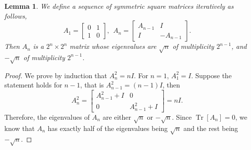 \documentclass[12pt]{article}
\DeclareMathOperator{\Tr}{Tr}
\theoremstyle{plain}
\newtheorem{lemma}[theorem]{Lemma}
\theoremstyle{definition}
\begin{document}
\begin{lemma}\label{lem_eig}
We define a sequence of symmetric square matrices iteratively as follows,
$$A_1=\begin{bmatrix} 0 & 1 \\
1 & 0 \end{bmatrix},~~A_{n}=\begin{bmatrix} A_{n-1} & I \\
I & -A_{n-1} \end{bmatrix}.$$
Then $A_n$ is a $2^{n} \times 2^n$ matrix whose eigenvalues are $\sqrt{n}$ of multiplicity $2^{n-1}$, and $-\sqrt{n}$ of multiplicity $2^{n-1}$.
\end{lemma}
\begin{proof}
We prove by induction that $A_n^2=n I$. For $n=1$, $A_1^2=I$. Suppose the statement holds for $n-1$, that is $A_{n-1}^2=(n-1)I$, then 
$$A_n^2=\begin{bmatrix} A_{n-1}^2+I & 0 \\
0 & A_{n-1}^2+I\end{bmatrix}=nI.$$
Therefore, the eigenvalues of $A_n$ are either $\sqrt{n}$ or $-\sqrt{n}$. Since $\Tr[A_n]=0$, we know that $A_n$ has exactly half of the eigenvalues being $\sqrt{n}$ and the rest being $-\sqrt{n}$.
\end{proof}
\end{document}
